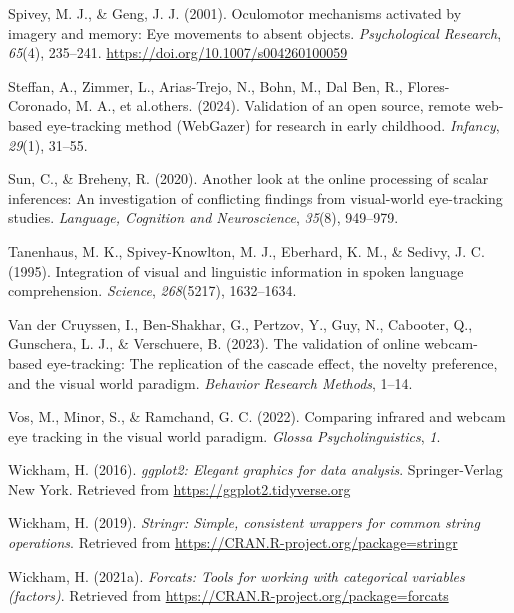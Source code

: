 \documentclass[
  man,floatsintext]{apa6}
\newlength{\cslhangindent}
\newenvironment{CSLReferences}[2] %
 {\begin{list}{}{%
  \setlength{\itemindent}{0pt}
  \setlength{\leftmargin}{0pt}
  \setlength{\parsep}{0pt}
  \ifodd #1
   \setlength{\leftmargin}{\cslhangindent}
   \setlength{\itemindent}{-1\cslhangindent}
  \fi
  \setlength{\itemsep}{#2\baselineskip}}}
 {\end{list}}
\begin{document}
\begin{CSLReferences}{1}{0}
Spivey, M. J., \& Geng, J. J. (2001). Oculomotor mechanisms activated by imagery and memory: Eye movements to absent objects. \emph{Psychological Research}, \emph{65}(4), 235--241. \url{https://doi.org/10.1007/s004260100059}

Steffan, A., Zimmer, L., Arias-Trejo, N., Bohn, M., Dal Ben, R., Flores-Coronado, M. A., et al.others. (2024). Validation of an open source, remote web-based eye-tracking method (WebGazer) for research in early childhood. \emph{Infancy}, \emph{29}(1), 31--55.

Sun, C., \& Breheny, R. (2020). Another look at the online processing of scalar inferences: An investigation of conflicting findings from visual-world eye-tracking studies. \emph{Language, Cognition and Neuroscience}, \emph{35}(8), 949--979.

Tanenhaus, M. K., Spivey-Knowlton, M. J., Eberhard, K. M., \& Sedivy, J. C. (1995). Integration of visual and linguistic information in spoken language comprehension. \emph{Science}, \emph{268}(5217), 1632--1634.

Van der Cruyssen, I., Ben-Shakhar, G., Pertzov, Y., Guy, N., Cabooter, Q., Gunschera, L. J., \& Verschuere, B. (2023). The validation of online webcam-based eye-tracking: The replication of the cascade effect, the novelty preference, and the visual world paradigm. \emph{Behavior Research Methods}, 1--14.

Vos, M., Minor, S., \& Ramchand, G. C. (2022). Comparing infrared and webcam eye tracking in the visual world paradigm. \emph{Glossa Psycholinguistics}, \emph{1}.

Wickham, H. (2016). \emph{ggplot2: Elegant graphics for data analysis}. Springer-Verlag New York. Retrieved from \url{https://ggplot2.tidyverse.org}

Wickham, H. (2019). \emph{Stringr: Simple, consistent wrappers for common string operations}. Retrieved from \url{https://CRAN.R-project.org/package=stringr}

Wickham, H. (2021a). \emph{Forcats: Tools for working with categorical variables (factors)}. Retrieved from \url{https://CRAN.R-project.org/package=forcats}


\end{CSLReferences}
\end{document}
